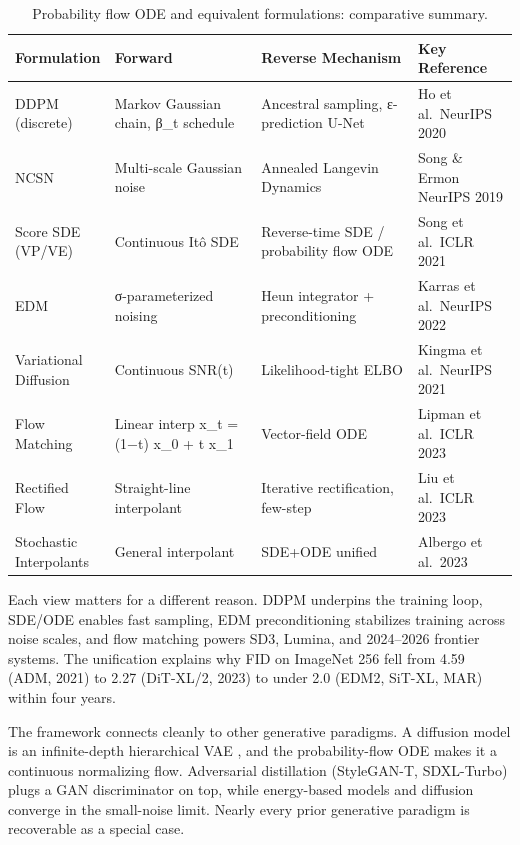 \documentclass{article}
\begin{document}
\begin{table}[t]
\centering
\caption{Probability flow ODE and equivalent formulations: comparative summary.}
\label{tab:probability-flow-ode-and-equivalent-formulations}
\begin{tabular}{>{\raggedright\arraybackslash}p{0.1840\linewidth}
  >{\raggedright\arraybackslash}p{0.2960\linewidth}
  >{\raggedright\arraybackslash}p{0.3120\linewidth}
  >{\raggedright\arraybackslash}p{0.2080\linewidth}}
\toprule
Formulation & Forward & Reverse Mechanism & Key Reference \\
\midrule
DDPM (discrete) & Markov Gaussian chain, β\_t schedule & Ancestral sampling, ε-prediction U-Net & Ho et al.~NeurIPS 2020 \\
NCSN & Multi-scale Gaussian noise & Annealed Langevin Dynamics & Song \& Ermon NeurIPS 2019 \\
Score SDE (VP/VE) & Continuous Itô SDE & Reverse-time SDE / probability flow ODE & Song et al.~ICLR 2021 \\
EDM & σ-parameterized noising & Heun integrator + preconditioning & Karras et al.~NeurIPS 2022 \\
Variational Diffusion & Continuous SNR(t) & Likelihood-tight ELBO & Kingma et al.~NeurIPS 2021 \\
Flow Matching & Linear interp x\_t = (1−t) x\_0 + t x\_1 & Vector-field ODE & Lipman et al.~ICLR 2023 \\
Rectified Flow & Straight-line interpolant & Iterative rectification, few-step & Liu et al.~ICLR 2023 \\
Stochastic Interpolants & General interpolant & SDE+ODE unified & Albergo et al.~2023 \\
\end{tabular}
\end{table}

Each view matters for a different reason. DDPM underpins the training loop, SDE/ODE enables fast sampling, EDM preconditioning stabilizes training across noise scales, and flow matching powers SD3, Lumina, and 2024--2026 frontier systems. The unification explains why FID on ImageNet 256 fell from 4.59 (ADM, 2021) to 2.27 (DiT-XL/2, 2023) to under 2.0 (EDM2, SiT-XL, MAR) within four years.

The framework connects cleanly to other generative paradigms. A diffusion model is an infinite-depth hierarchical VAE \citep{kingma2021variationaldiffusi}, and the probability-flow ODE makes it a continuous normalizing flow. Adversarial distillation (StyleGAN-T, SDXL-Turbo) plugs a GAN discriminator on top, while energy-based models and diffusion converge in the small-noise limit. Nearly every prior generative paradigm is recoverable as a special case.
\end{document}
